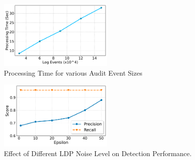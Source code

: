 \begin{figure}[t!]
  \centering
  \includegraphics[width=0.50\textwidth]{fig/sizevstime.pdf}
  \caption{Processing Time for various Audit Event Sizes}
  \label{sizevstime}
  \vspace{-2ex}
\end{figure}

\begin{figure}[t!]
  \centering
  \includegraphics[width=0.50\textwidth]{fig/epsvsscore.pdf}
  \caption{Effect of Different LDP Noise Level on Detection Performance.}
  \label{epsvsscore}
  \vspace{-2ex}
\end{figure}

